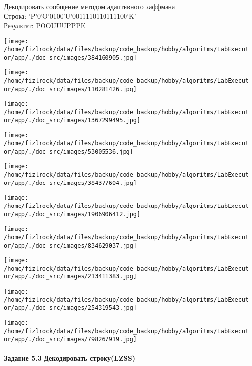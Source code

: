 \documentclass[a4paper, 12pt]{article}
\begin{document}
\\ 

Декодировать сообщение методом адаптивного хаффмана \\
Строка: 
'P'0'O'0100'U'0011110110111100'K'\\
Результат: POOUUUPPPK

\texttt{[image: /home/fizlrock/data/files/backup/code\_backup/hobby/algoritms/LabExecutor/app/./doc\_src/images/384160905.jpg]}

\texttt{[image: /home/fizlrock/data/files/backup/code\_backup/hobby/algoritms/LabExecutor/app/./doc\_src/images/110281426.jpg]}

\texttt{[image: /home/fizlrock/data/files/backup/code\_backup/hobby/algoritms/LabExecutor/app/./doc\_src/images/1367299495.jpg]}

\texttt{[image: /home/fizlrock/data/files/backup/code\_backup/hobby/algoritms/LabExecutor/app/./doc\_src/images/53005536.jpg]}

\texttt{[image: /home/fizlrock/data/files/backup/code\_backup/hobby/algoritms/LabExecutor/app/./doc\_src/images/384377604.jpg]}

\texttt{[image: /home/fizlrock/data/files/backup/code\_backup/hobby/algoritms/LabExecutor/app/./doc\_src/images/1906906412.jpg]}

\texttt{[image: /home/fizlrock/data/files/backup/code\_backup/hobby/algoritms/LabExecutor/app/./doc\_src/images/834629037.jpg]}

\texttt{[image: /home/fizlrock/data/files/backup/code\_backup/hobby/algoritms/LabExecutor/app/./doc\_src/images/213411383.jpg]}

\texttt{[image: /home/fizlrock/data/files/backup/code\_backup/hobby/algoritms/LabExecutor/app/./doc\_src/images/254319543.jpg]}

\texttt{[image: /home/fizlrock/data/files/backup/code\_backup/hobby/algoritms/LabExecutor/app/./doc\_src/images/798267919.jpg]}
\pagebreak
\paragraph{Задание 5.3 Декодировать строку(LZSS)\\}
\end{document}
